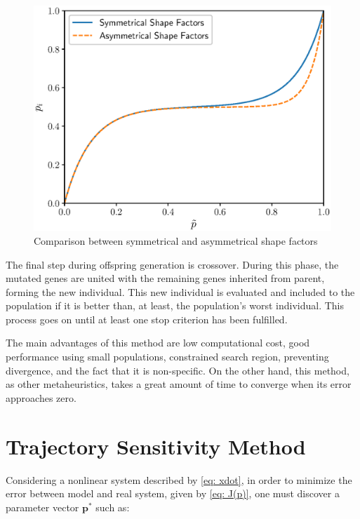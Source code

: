 \begin{figure}[h]
	\caption{Comparison between symmetrical and asymmetrical shape factors}
	\begin{center}
		\includegraphics[scale=.7]{Images/symmetrical_transf.eps}
	\end{center}
	\label{fig: diffs}
\end{figure}

The final step during offspring generation is crossover. During this phase, the mutated genes are united with the remaining genes inherited from parent, forming the new individual. This new individual is evaluated and included to the population if it is better than, at least, the population's worst individual. This process goes on until at least one stop criterion has been fulfilled.

The main advantages of this method are low computational cost, good performance using small populations, constrained search region, preventing divergence, and the fact that it is non-specific. On the other hand, this method, as other metaheuristics, takes a great amount of time to converge when its error approaches zero.

\section{Trajectory Sensitivity Method}

Considering a nonlinear system described by \eqref{eq: xdot}, in order to minimize the error between model and real system, given by \eqref{eq: J(p)}, one must discover a parameter vector $\mathbf{p^{*}}$ such as:

